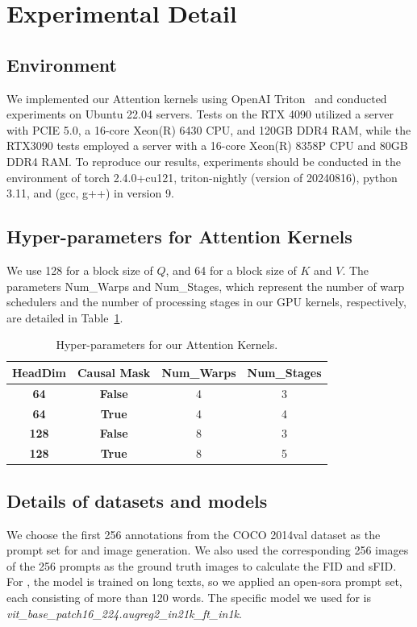 \section{Experimental Detail} \label{sec:exp_details}


\subsection{Environment}
We implemented our Attention kernels using OpenAI Triton~\citep{openaitriton} and conducted experiments on Ubuntu 22.04 servers. Tests on the RTX 4090 utilized a server with PCIE 5.0, a 16-core Xeon(R) 6430 CPU, and 120GB DDR4 RAM, while the RTX3090 tests employed a server with a 16-core Xeon(R) 8358P CPU and 80GB DDR4 RAM.
To reproduce our results, experiments should be conducted in the environment of torch 2.4.0+cu121, triton-nightly (version of 20240816), python 3.11, and (gcc, g++) in version 9.

\subsection{Hyper-parameters for Attention Kernels}

We use 128 for a block size of $Q$, and 64 for a block size of $K$ and $V$.
The parameters {Num\_Warps} and {Num\_Stages}, which represent the number of warp schedulers and the number of processing stages in our GPU kernels, respectively, are detailed in Table~\ref{tab:kernel_para}.



\begin{table}[!htb]
\caption{Hyper-parameters for our Attention Kernels.}
\label{tab:kernel_para}
\setlength\tabcolsep{12pt}
\centering 
    \begin{tabular}{c|c|c|c} 
    \toprule
    \textbf{HeadDim} & \textbf{Causal Mask} & \textbf{Num\_Warps} & \textbf{Num\_Stages} \\
    \hline
    \bf 64  & \bf False & 4 & 3 \\ 
    \bf 64  & \bf True  & 4 & 4 \\
    \bf 128 & \bf False & 8 & 3 \\
    \bf 128 & \bf True  & 8 & 5 \\  \bottomrule
    \end{tabular}
\end{table}


\subsection{Details of datasets and models}
We choose the first 256 annotations from the COCO 2014val dataset as the prompt set for \ultrapixel and \unidiffuser image generation.
We also used the corresponding 256 images of the 256 prompts as the ground truth images to calculate the FID and sFID.
For \cogvideo, the model is trained on long texts, so we applied an open-sora prompt set, each consisting of more than 120 words.
The specific model we used for \timm is \textit{vit\_base\_patch16\_224.augreg2\_in21k\_ft\_in1k}.


